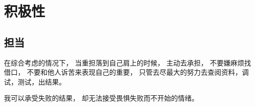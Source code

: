 
\chapter{积极性}

\section{担当}

在综合考虑的情况下，
当重担落到自己肩上的时候，
主动去承担，
不要嫌麻烦找借口，
不要和他人诉苦来表现自己的重要，
只管去尽最大的努力去查阅资料，调试，测试，出结果。

我可以承受失败的结果，
却无法接受畏惧失败而不开始的情绪。
